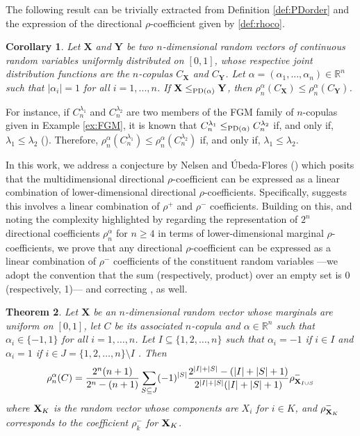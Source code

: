 \documentclass[11pt,a4paper]{article}
\newtheorem{theorem}{Theorem}
\newtheorem{corollary}[theorem]{Corollary}
\def\XX{{\mathbf X}}
\def\YY{{\mathbf Y}}
\begin{document}
The following result can be trivially extracted from Definition \ref{def:PDorder} and  the expression of the directional $\rho$-coefficient given by \eqref{def:rhoco}.

\begin{corollary}
    Let $\XX$ and $\YY$ be two $n$-dimensional random vectors of continuous random variables uniformly distributed on $[0,1]$, whose respective joint distribution functions are the $n$-copulas $C_{\XX}$ and $C_{\YY}$. Let $\alpha=(\alpha_1,...,\alpha_n)\in\mathbb{R}^n$ such that $|\alpha_i|=1$ for all $i=1,...,n$. If $\XX\leq_{{\rm PD}(\alpha)}\YY$, then $\rho_n^\alpha(C_{\XX})\leq\rho_n^\alpha(C_{\YY})$.
\end{corollary}

For instance, if $C^{\lambda_1}_n$ and $C^{\lambda_2}_n$ are two members of the FGM family of $n$-copulas given in Example \ref{ex:FGM}, it is known that $C^{\lambda_1}_n\leq_{{\rm PD}(\alpha)}C^{\lambda_2}_n$ if, and only if, $\lambda_1\leq\lambda_2$ (\cite{Edeamo2024}). Therefore, $\rho_n^\alpha(C^{\lambda_1}_n)\leq\rho_n^\alpha(C^{\lambda_2}_n)$ if, and only if, $\lambda_1\leq\lambda_2$.



In this work, we address a conjecture by Nelsen and Úbeda-Flores (\cite{Ne2011}) which posits that the multidimensional directional $\rho$-coefficient can be expressed as a linear combination of lower-dimensional directional $\rho$-coefficients. Specifically, \cite{Ne2011} suggests this involves a linear combination of $\rho^+$ and $\rho^-$ coefficients. Building on this, and noting the complexity highlighted by \cite{Gar2013} regarding the representation of $2^n$ directional coefficients $\rho_n^{\alpha}$ for $n\geq 4$ in terms of lower-dimensional marginal $\rho$-coefficients, we prove that any directional $\rho$-coefficient can be expressed as a linear combination of $\rho^-$ coefficients of the constituent random variables ---we adopt the convention that the sum (respectively, product) over an empty set is 0 (respectively, 1)--- and correcting \cite[Equation (10)]{Gar2013}, as well.

\begin{theorem} \label{theo: rho}
     Let $\XX$ be an $n$-dimensional random vector whose marginals are uniform on $[0,1]$, let $C$ be its associated $n$-copula and $\alpha\in\mathbb{R}^n$ such that $\alpha_i\in\{-1,1\}$ for all $i=1,\ldots,n$. Let $I\subseteq\{1,2,\ldots,n\}$ such that $\alpha_i=-1$ if $i\in I$ and $\alpha_i=1$ if $i\in J=\{1,2,\ldots,n\}\setminus I$%
     . Then
 $$\rho_n^\alpha(C)=\frac{2^n(n+1)}{2^n-(n+1)} \sum_{S \subseteq J%
 } (-1)^{|S|} \frac{2^{|I|+|S|}-(|I|+|S|+1)}{2^{|I|+|S|}(|I|+|S|+1)} \rho_{{\bf X}_{I \cup S}}^-$$
     where ${\bf X}_K$ is the random vector whose components are $X_i$ for $i\in K$, and $\rho_{{\bf X}_{K}}^-$ corresponds to the coefficient $\rho_k^-$ for ${\bf X}_K$.
\end{theorem}
\end{document}
